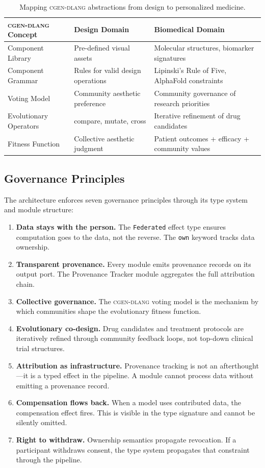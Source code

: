 \documentclass[11pt,letterpaper]{article}
\newcommand{\cgen}{\textsc{cgen-dlang}}
\begin{document}
\begin{table}[H]
\centering
\begin{tabularx}{\textwidth}{lXX}
\toprule
\textbf{\cgen{} Concept} & \textbf{Design Domain} & \textbf{Biomedical Domain} \\
\midrule
Component Library & Pre-defined visual assets & Molecular structures, biomarker signatures \\
Component Grammar & Rules for valid design operations & Lipinski's Rule of Five, AlphaFold constraints \\
Voting Model & Community aesthetic preference & Community governance of research priorities \\
Evolutionary Operators & compare, mutate, cross & Iterative refinement of drug candidates \\
Fitness Function & Collective aesthetic judgment & Patient outcomes + efficacy + community values \\
\bottomrule
\end{tabularx}
\caption{Mapping \cgen{} abstractions from design to personalized medicine.}
\label{tab:cgen-mapping}
\end{table}

\subsection{Governance Principles}

The architecture enforces seven governance principles through its type system and module structure:

\begin{enumerate}[leftmargin=*]
  \item \textbf{Data stays with the person.} The \texttt{Federated} effect type ensures computation goes to the data, not the reverse. The \texttt{own} keyword tracks data ownership.
  \item \textbf{Transparent provenance.} Every module emits provenance records on its output port. The Provenance Tracker module aggregates the full attribution chain.
  \item \textbf{Collective governance.} The \cgen{} voting model is the mechanism by which communities shape the evolutionary fitness function.
  \item \textbf{Evolutionary co-design.} Drug candidates and treatment protocols are iteratively refined through community feedback loops, not top-down clinical trial structures.
  \item \textbf{Attribution as infrastructure.} Provenance tracking is not an afterthought---it is a typed effect in the pipeline. A module cannot process data without emitting a provenance record.
  \item \textbf{Compensation flows back.} When a model uses contributed data, the compensation effect fires. This is visible in the type signature and cannot be silently omitted.
  \item \textbf{Right to withdraw.} Ownership semantics propagate revocation. If a participant withdraws consent, the type system propagates that constraint through the pipeline.
\end{enumerate}
\end{document}
